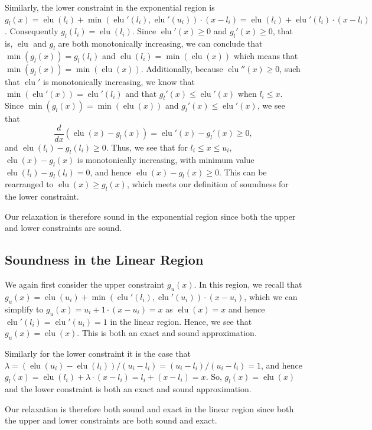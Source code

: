\documentclass{llncs}
\DeclareMathOperator{\elu}{elu}
\begin{document}
Similarly, the lower constraint in the exponential region is $g_l(x) = \elu(l_i) + \min(\elu'(l_i), \elu'(u_i)) \cdot (x - l_i) = \elu(l_i) + \elu'(l_i) \cdot (x - l_i)$.
Consequently $g_l(l_i) = \elu(l_i)$.
Since $\elu'(x) \geq 0$ and $g_l'(x) \geq 0$, that is, $\elu$ and $g_l$ are both monotonically increasing, we can conclude that $\min(g_l(x)) = g_l(l_i)$ and $\elu(l_i) = \min(\elu(x))$ which means that $\min(g_l(x)) = \min(\elu(x))$.
Additionally, because $\elu''(x) \geq 0$, such that $\elu'$ is monotonically increasing, we know that $\min(\elu'(x)) = \elu'(l_i)$ and that $g_l'(x) \leq \elu'(x)$ when $l_i \leq x$.
Since $\min(g_l(x)) = \min(\elu(x))$ and $g_l'(x) \leq \elu'(x)$,
we see that 
$$ \frac{d}{dx}\left( \elu(x) - g_l(x) \right) = \elu'(x) - g_l'(x) \geq 0, $$
and $\elu(l_i) -g_l(l_i) \ge 0$.
Thus, we see that for $l_i \leq x \leq u_i$, $\elu(x) - g_l(x)$ is monotonically increasing, with minimum value $\elu(l_i) - g_l(l_i) = 0$, and hence $\elu(x) - g_l(x) \geq 0$.
This can be rearranged to $\elu(x) \geq g_l(x)$, which meets our definition of soundness for the lower constraint.

Our relaxation is therefore sound in the exponential region since both the upper and lower constraints are sound.

\subsection{Soundness in the Linear Region}
We again first consider the upper constraint $g_u(x)$.
In this region, we recall that $g_u(x) = \elu(u_i) + \min(\elu'(l_i), \elu'(u_i))\cdot (x-u_i)$, which we can simplify to
$g_u(x) = u_i + 1 \cdot (x-u_i) = x$ as $\elu(x)=x$ and hence $\elu'(l_i)=\elu'(u_i)=1$ in the linear region.
Hence, we see that $g_u(x) = \elu(x)$.
This is both an exact and sound approximation.

Similarly for the lower constraint it is the case that
$\lambda = (\elu(u_i) - \elu(l_i))/(u_i - l_i) = (u_i - l_i)/(u_i - l_i) = 1$, and hence
$g_l(x) = \elu(l_i) + \lambda \cdot (x - l_i) = l_i + (x - l_i) = x$.
So, $g_l(x) = \elu(x)$ and the lower constraint is both an exact and sound approximation.

Our relaxation is therefore both sound and exact in the linear region since both the upper and lower constraints are both sound and exact.
\end{document}
